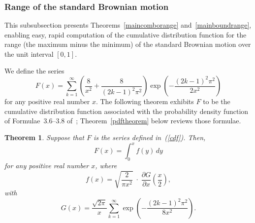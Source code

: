 \documentclass[12pt]{article}
\newtheorem{theorem}{Theorem}[]
\begin{document}
\subsubsection{Range of the standard Brownian motion}
\label{rangeBrownian}

This subsubsection presents Theorems~\ref{maincomborange}
and~\ref{mainboundrange}, enabling easy, rapid computation
of the cumulative distribution function for the range
(the maximum minus the minimum) of the standard Brownian motion
over the unit interval $[0, 1]$.

We define the series
%
\begin{equation}
\label{cdf}
F(x) = \sum_{k=1}^\infty
\left( \frac{8}{x^2} + \frac{8}{(2k-1)^2 \pi^2} \right)
\exp\left(-\frac{(2k-1)^2 \pi^2}{2x^2}\right)
\end{equation}
%
for any positive real number $x$.
The following theorem exhibits $F$ to be the cumulative distribution function
associated with the probability density function
of Formulae~3.6--3.8 of~\citet{feller};
Theorem~\ref{pdftheorem} below reviews those formulae.

\begin{theorem}
\label{cdftheorem}
Suppose that $F$ is the series defined in~(\ref{cdf}).
Then,
%
\begin{equation}
F(x) = \int_0^x f(y) \, dy
\end{equation}
%
for any positive real number $x$,
%
where
%
\begin{equation}
\label{pdf}
f(x) = \sqrt{\frac{2}{\pi x^2}} \;\cdot\;
\frac{\partial G}{\partial x}\left(\frac{x}{2}\right),
\end{equation}
%
with
%
\begin{equation}
\label{G}
G(x) = \frac{\sqrt{2\pi}}{x} \sum_{k=1}^\infty
\exp\left( -\frac{(2k-1)^2 \pi^2}{8x^2} \right).
\end{equation}
%
\end{theorem}
\end{document}
